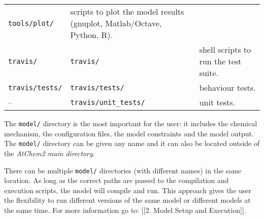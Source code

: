 \begin{longtable}[]{@{}lll@{}}
\begin{minipage}[t]{0.24\columnwidth}
\texttt{tools/plot/}\strut
\end{minipage} & \begin{minipage}[t]{0.48\columnwidth}\raggedright
scripts to plot the model results (gnuplot, Matlab/Octave, Python,
R).\strut
\end{minipage}\tabularnewline
\begin{minipage}[t]{0.20\columnwidth}\raggedright
\texttt{travis/}\strut
\end{minipage} & \begin{minipage}[t]{0.24\columnwidth}\raggedright
\texttt{travis/}\strut
\end{minipage} & \begin{minipage}[t]{0.48\columnwidth}\raggedright
shell scripts to run the test suite.\strut
\end{minipage}\tabularnewline
\begin{minipage}[t]{0.20\columnwidth}\raggedright
\texttt{travis/tests/}\strut
\end{minipage} & \begin{minipage}[t]{0.24\columnwidth}\raggedright
\texttt{travis/tests/}\strut
\end{minipage} & \begin{minipage}[t]{0.48\columnwidth}\raggedright
behaviour tests.\strut
\end{minipage}\tabularnewline
\begin{minipage}[t]{0.20\columnwidth}\raggedright
--\strut
\end{minipage} & \begin{minipage}[t]{0.24\columnwidth}\raggedright
\texttt{travis/unit\_tests/}\strut
\end{minipage} & \begin{minipage}[t]{0.48\columnwidth}\raggedright
unit tests.\strut
\end{minipage}\tabularnewline
\end{longtable}

The \texttt{model/} directory is the most important for the user: it
includes the chemical mechanism, the configuration files, the model
constraints and the model output. The \texttt{model/} directory can be
given any name and it can also be located outside of the \emph{AtChem2
main directory}.

There can be multiple \texttt{model/} directories (with different names)
in the same location. As long as the correct paths are passed to the
compilation and execution scripts, the model will compile and run. This
approach gives the user the flexibility to run different versions of the
same model or different models at the same time. For more information go
to: {[}{[}2. Model Setup and Execution{]}{]}.

